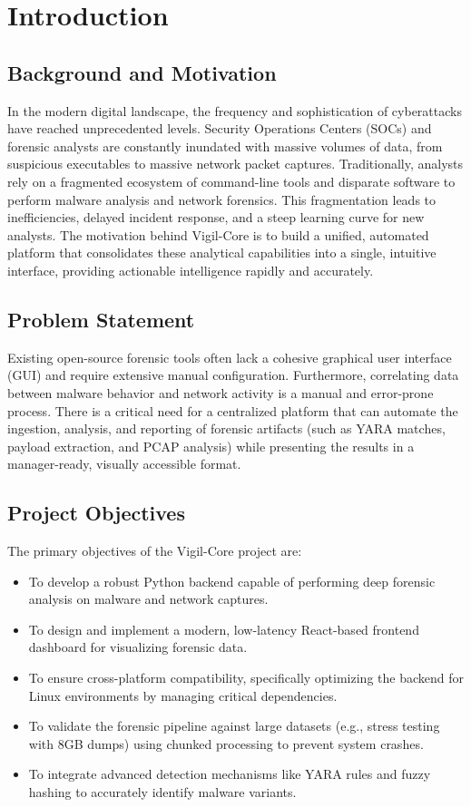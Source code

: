 \chapter{Introduction}

\section{Background and Motivation}
In the modern digital landscape, the frequency and sophistication of cyberattacks have reached unprecedented levels. Security Operations Centers (SOCs) and forensic analysts are constantly inundated with massive volumes of data, from suspicious executables to massive network packet captures. Traditionally, analysts rely on a fragmented ecosystem of command-line tools and disparate software to perform malware analysis and network forensics. This fragmentation leads to inefficiencies, delayed incident response, and a steep learning curve for new analysts. The motivation behind Vigil-Core is to build a unified, automated platform that consolidates these analytical capabilities into a single, intuitive interface, providing actionable intelligence rapidly and accurately.

\section{Problem Statement}
Existing open-source forensic tools often lack a cohesive graphical user interface (GUI) and require extensive manual configuration. Furthermore, correlating data between malware behavior and network activity is a manual and error-prone process. There is a critical need for a centralized platform that can automate the ingestion, analysis, and reporting of forensic artifacts (such as YARA matches, payload extraction, and PCAP analysis) while presenting the results in a manager-ready, visually accessible format.

\section{Project Objectives}
The primary objectives of the Vigil-Core project are:
\begin{itemize}
    \item To develop a robust Python backend capable of performing deep forensic analysis on malware and network captures.
    \item To design and implement a modern, low-latency React-based frontend dashboard for visualizing forensic data.
    \item To ensure cross-platform compatibility, specifically optimizing the backend for Linux environments by managing critical dependencies.
    \item To validate the forensic pipeline against large datasets (e.g., stress testing with 8GB dumps) using chunked processing to prevent system crashes.
    \item To integrate advanced detection mechanisms like YARA rules and fuzzy hashing to accurately identify malware variants.
\end{itemize}

